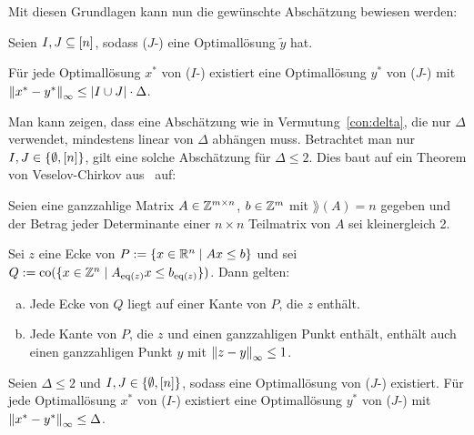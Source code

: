 Mit diesen Grundlagen kann nun die gewünschte Abschätzung bewiesen werden:

\renewcommand{\thetheorem}{2.11}
\begin{theorem}\label{thm:theo2}
	Seien $I,J\subseteq[n]$, sodass ($J$-\MIPI) eine Optimallösung $\tilde{y}$ hat.
	
	Für jede Optimallösung $x^*$ von ($I$-\MIPI) existiert eine Optimallösung $y^*$ von ($J$-\MIPI) mit $\left\lVert x^*-y^*\right\rVert_\infty\leq\lvert I\cup J \rvert\cdot\Delta$.
\end{theorem}

Man kann zeigen, dass eine Abschätzung wie in Vermutung~\ref{con:delta}, die nur $\Delta$ verwendet, mindestens linear von $\Delta$ abhängen muss.
Betrachtet man nur $I,J\in\{\emptyset, [n] \}$, gilt eine solche Abschätzung für $\Delta\leq 2$.
Dies baut auf ein Theorem von Veselov-Chirkov aus~\cite[Theorem 2 und Beweis]{VESELOV2009220} auf:

\renewcommand{\thelemma}{3.3}
\begin{lemma}\label{lem:veselov}
	Seien eine ganzzahlige Matrix $A\in\mathbb{Z}^{m\times n}$, $b\in\mathbb{Z}^m$ mit $\rang(A)=n$ gegeben und der Betrag jeder Determinante einer $n\times n$ Teilmatrix von $A$ sei kleinergleich 2.
	
	Sei $z$ eine Ecke von $P:=\{x\in\mathbb{R}^n\mid Ax\leq b \}$ und sei $Q:=\operatorname{co}(\{x\in\mathbb{Z}^n \mid A_{\operatorname{eq}(z)}x \leq b_{\operatorname{eq}(z)} \})$.
	Dann gelten:
	\begin{enumerate}[(a)]
		\item Jede Ecke von $Q$ liegt auf einer Kante von $P$, die $z$ enthält.
		\item Jede Kante von $P$, die $z$ und einen ganzzahligen Punkt enthält, enthält auch einen ganzzahligen Punkt $y$ mit $\left\lVert z -y\right\rVert_\infty\leq 1$.
	\end{enumerate}
\end{lemma}

\renewcommand{\thetheorem}{3.9}
\begin{theorem}
	Seien $\Delta\leq 2$ und $I,J\in\{\emptyset,[n]\}$, sodass eine Optimallösung von \mbox{($J$-\MIPI)} existiert.
	Für jede Optimallösung $x^*$ von ($I$-\MIPI) existiert eine Optimallösung $y^*$ von ($J$-\MIPI) mit $\left\lVert x^*-y^*\right\rVert_\infty\leq \Delta$.
\end{theorem}
